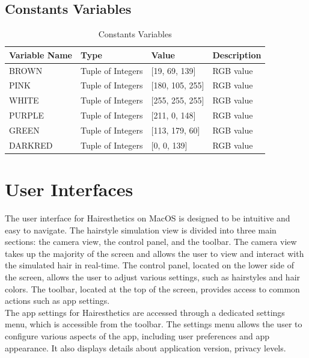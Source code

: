\documentclass[12pt, titlepage]{article}
\begin{document}
\subsection{Constants Variables}
\begin{flushleft}
\begin{table}[H]
\begin{tabularx}{\linewidth}{|l|l|l|X|}
    \toprule {\bf Variable Name} & {\bf Type} & {\bf Value} & {\bf Description}\\
    \midrule
    BROWN & Tuple of Integers & [19, 69, 139] & RGB value\\
    \hline
    PINK & Tuple of Integers & [180, 105, 255] & RGB value\\
    \hline
    WHITE & Tuple of Integers & [255, 255, 255] & RGB value\\
    \hline
    PURPLE & Tuple of Integers & [211, 0, 148] & RGB value\\
    \hline
    GREEN & Tuple of Integers & [113, 179, 60] & RGB value\\
    \hline
    DARKRED & Tuple of Integers & [0, 0, 139]& RGB value\\
    \bottomrule
\end{tabularx}
    \caption{Constants Variables}
\end{table}
\end{flushleft}

\section{User Interfaces}
The user interface for Hairesthetics on MacOS is designed to be intuitive and easy to navigate. The hairstyle simulation view is divided into three main sections: the camera view, the control panel, and the toolbar. The camera view takes up the majority of the screen and allows the user to view and interact with the simulated hair in real-time. The control panel, located on the lower side of the screen, allows the user to adjust various settings, such as hairstyles and hair colors. The toolbar, located at the top of the screen, provides access to common actions such as app settings. \\

\noindent The app settings for Hairesthetics are accessed through a dedicated settings menu, which is accessible from the toolbar. The settings menu allows the user to configure various aspects of the app, including user preferences and app appearance. It also displays details about application version, privacy levels. \\
\end{document}
